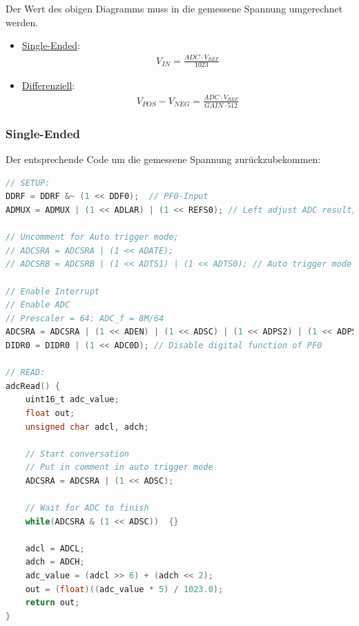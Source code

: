 Der Wert des obigen Diagramms muss in die gemessene Spannung umgerechnet werden.
\begin{itemize}
    \item \underline{Single-Ended}:
    \begin{align}
        V_{IN} = \frac{ADC \cdot V_{REF}}{1023}
    \end{align}
    \item \underline{Differenziell}:\\
    \begin{align}
        V_{POS} - V_{NEG} = \frac{ADC \cdot V_{REF}}{GAIN \cdot 512}
    \end{align}
\end{itemize}

\newpage

\subsubsection*{Single-Ended}
Der entsprechende Code um die gemessene Spannung zurückzubekommen:
\begin{lstlisting}[language=C]
// SETUP:
DDRF = DDRF &~ (1 << DDF0);	 // PF0-Input
ADMUX = ADMUX | (1 << ADLAR) | (1 << REFS0); // Left adjust ADC result; Voltage reference

// Uncomment for Auto trigger mode; 
// ADCSRA = ADCSRA | (1 << ADATE);
// ADCSRB = ADCSRB | (1 << ADTS1) | (1 << ADTS0); // Auto trigger mode Taktquelle (Timer0)

// Enable Interrupt
// Enable ADC
// Prescaler = 64: ADC_f = 8M/64
ADCSRA = ADCSRA | (1 << ADEN) | (1 << ADSC) | (1 << ADPS2) | (1 << ADPS1);
DIDR0 = DIDR0 | (1 << ADC0D); // Disable digital function of PF0

// READ:
adcRead() {
    uint16_t adc_value;
    float out;
    unsigned char adcl, adch;

    // Start conversation
    // Put in comment in auto trigger mode
    ADCSRA = ADCSRA | (1 << ADSC);

    // Wait for ADC to finish
    while(ADCSRA & (1 << ADSC))  {}

    adcl = ADCL;
    adch = ADCH;
    adc_value = (adcl >> 6) + (adch << 2);
    out = (float)((adc_value * 5) / 1023.0);
    return out;
}
\end{lstlisting}

